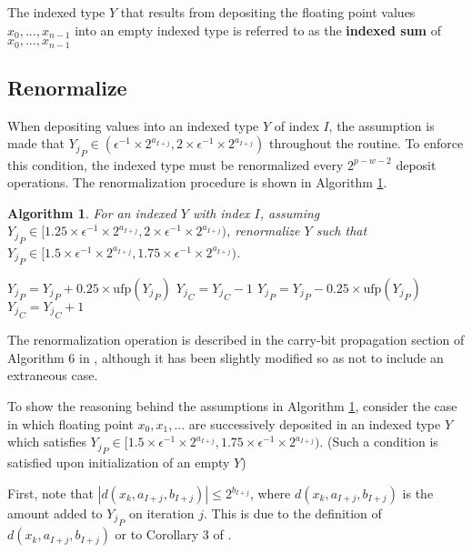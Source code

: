\documentclass[12pt]{article}
\providecommand{\ufp}{\ensuremath{\text{ufp}}}
\providecommand{\To}{\ensuremath{\text{ to }}}
\theoremstyle{plain}
\newtheorem{alg}{Algorithm}[section]
\numberwithin{equation}{section}
\begin{document}
    The indexed type $Y$ that results from depositing the floating point values $x_0, ..., x_{n - 1}$ into an empty indexed type is referred to as the \textbf{indexed sum} of $x_0, ..., x_{n - 1}$

  \subsection{Renormalize}
    \label{sec:renormalize}
    When depositing values into an indexed type $Y$ of index $I$, the assumption is made that ${Y_j}_P \in (\epsilon^{-1}\times 2^{a_{I + j}}, 2 \times \epsilon^{-1}\times 2^{a_{I + j}})$ throughout the routine. To enforce this condition, the indexed type must be renormalized every $2^{p - w - 2}$ deposit operations. The renormalization procedure is shown in Algorithm \ref{alg:renorm}.
    \begin{alg}
      For an indexed $Y$ with index $I$, assuming ${Y_j}_P \in [1.25 \times \epsilon^{-1}\times 2^{a_{I + j}}, 2 \times \epsilon^{-1}\times 2^{a_{I + j}})$, renormalize $Y$ such that ${Y_j}_P \in [1.5 \times \epsilon^{-1}\times 2^{a_{I + j}}, 1.75 \times \epsilon^{-1}\times 2^{a_{I + j}})$.
      \begin{algorithmic}[1]
          \For{$j = 0 \To fold - 1$}
            \If{${Y_j}_P < 1.5 \times \ufp({Y_j}_P)$}
              \State ${Y_j}_P = {Y_j}_P + 0.25 \times \ufp({Y_j}_P)$
              \State ${Y_j}_C = {Y_j}_C - 1$
            \EndIf
            \If{${Y_j}_P \geq 1.75 \times \ufp({Y_j}_P)$}
              \State ${Y_j}_P = {Y_j}_P - 0.25 \times \ufp({Y_j}_P)$
              \State ${Y_j}_C = {Y_j}_C + 1$
            \EndIf
          \EndFor
        \EndFunction
      \end{algorithmic}
      \label{alg:renorm}
    \end{alg}
    The renormalization operation is described in the carry-bit propagation section of Algorithm $6$ in \cite{repsum}, although it has been slightly modified so as not to include an extraneous case.

    To show the reasoning behind the assumptions in Algorithm \ref{alg:renorm}, consider the case in which floating point $x_0, x_1, ...$ are successively deposited in an indexed type $Y$ which satisfies ${Y_j}_P \in [1.5 \times \epsilon^{-1}\times 2^{a_{I + j}}, 1.75 \times \epsilon^{-1}\times 2^{a_{I + j}})$. (Such a condition is satisfied upon initialization of an empty $Y$)

    First, note that $|d(x_k, a_{I + j}, b_{I + j})| \leq 2^{b_{I + j}}$, where $d(x_k, a_{I + j}, b_{I + j})$ is the amount added to ${Y_j}_P$ on iteration $j$. This is due to the definition of $d(x_k, a_{I+j}, b_{I + j})$ or to Corollary 3 of \cite{repsum}.
\end{document}

